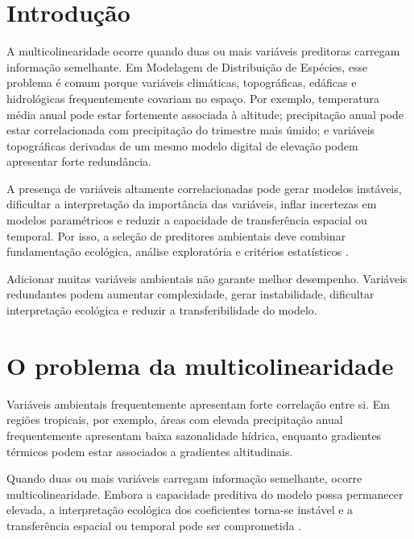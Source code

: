 \documentclass{ueap-sdm}
\begin{document}
\section{Introdução}

A multicolinearidade ocorre quando duas ou mais variáveis preditoras carregam informação semelhante. Em Modelagem de Distribuição de Espécies, esse problema é comum porque variáveis climáticas, topográficas, edáficas e hidrológicas frequentemente covariam no espaço. Por exemplo, temperatura média anual pode estar fortemente associada à altitude; precipitação anual pode estar correlacionada com precipitação do trimestre mais úmido; e variáveis topográficas derivadas de um mesmo modelo digital de elevação podem apresentar forte redundância.

A presença de variáveis altamente correlacionadas pode gerar modelos instáveis, dificultar a interpretação da importância das variáveis, inflar incertezas em modelos paramétricos e reduzir a capacidade de transferência espacial ou temporal. Por isso, a seleção de preditores ambientais deve combinar fundamentação ecológica, análise exploratória e critérios estatísticos \parencite{guisan2017habitat,naimi2016sdm,raes2018modeling}.

\begin{atencao}[title={\faExclamationTriangle\quad Mais variáveis não significam melhor modelo}]
	Adicionar muitas variáveis ambientais não garante melhor desempenho. Variáveis redundantes podem aumentar complexidade, gerar instabilidade, dificultar interpretação ecológica e reduzir a transferibilidade do modelo.
\end{atencao}

\section{O problema da multicolinearidade}

Variáveis ambientais frequentemente apresentam forte correlação entre si. Em regiões tropicais, por exemplo, áreas com elevada precipitação anual frequentemente apresentam baixa sazonalidade hídrica, enquanto gradientes térmicos podem estar associados a gradientes altitudinais.

Quando duas ou mais variáveis carregam informação semelhante, ocorre multicolinearidade. Embora a capacidade preditiva do modelo possa permanecer elevada, a interpretação ecológica dos coeficientes torna-se instável e a transferência espacial ou temporal pode ser comprometida \parencite{dormann2013collinearity}.
\end{document}
